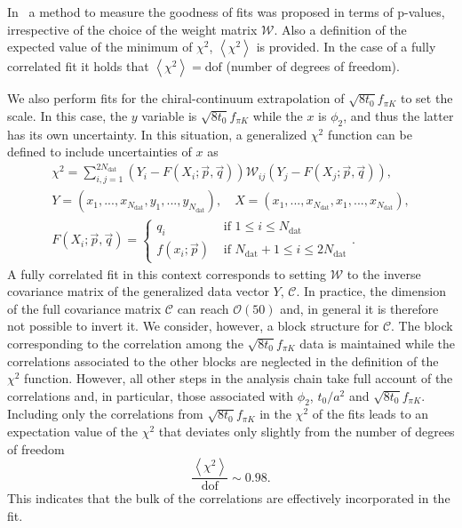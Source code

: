 In~\citep{Bruno:2022mfy} a method to measure the goodness of fits was proposed in terms of p-values, irrespective of the choice of the weight matrix $\mathcal{W}$. Also a definition of the expected value of the minimum of $\chi^2$, $\left<\chi^2\right>$ is provided. In the case of a fully correlated fit it holds that $\left<\chi^2\right>={\textrm{dof}}$ (number of degrees of freedom).

We also perform fits for the chiral-continuum extrapolation of $\sqrt{8t_0}f_{\pi K}$ to set the scale. In this case, the $y$ variable is $\sqrt{8t_0}f_{\pi K}$ while the $x$ is $\phi_2$, and thus the latter has its own uncertainty. In this situation, a generalized $\chi^2$ function can be defined to include uncertainties of $x$ as
\begin{gather}
\label{apex_chisq:eq:chisq_generalized}
\chi^2=\sum_{i,j=1}^{2N_{\textrm{dat}}}\left(Y_i-F(X_i;\vec{p},\vec{q})\right)\mathcal{W}_{ij}\left(Y_j-F(X_j;\vec{p},\vec{q})\right), \\
Y=(x_1,...,x_{N_{\textrm{dat}}},y_1,...,y_{N_{\textrm{dat}}}), \quad
X=(x_1,...,x_{N_{\textrm{dat}}},x_1,...,x_{N_{\textrm{dat}}}), \\
F(X_i;\vec{p},\vec{q})=\left\{\begin{matrix}
q_i & \textrm{ if $1\leq i\leq N_{\textrm{dat}}$} \\ 
f(x_i;\vec{p}) & \textrm{ if $N_{\textrm{dat}}+1\leq i\leq 2N_{\textrm{dat}}$}
\end{matrix}\right..
\end{gather}
A fully correlated fit in this context corresponds to setting $\mathcal{W}$ to the inverse covariance matrix of the generalized data vector $Y$, $\mathcal{C}$. In practice, the dimension of the full covariance matrix $\mathcal{C}$ can reach $\mathcal{O}(50)$ and, in general it is therefore not possible to invert it. We consider, however, a block structure for $\mathcal{C}$. The block corresponding to the correlation among  the $\sqrt{8t_0}f_{\pi K}$ data is maintained while the correlations associated to the other blocks are neglected in the definition of the $\chi^2$ function. However, all other steps in the analysis chain take full account  of the correlations and, in particular, those associated with $\phi_2$, $t_0/a^2$ and $\sqrt{8t_0}f_{\pi K}$. Including only the correlations from $\sqrt{8t_0}f_{\pi K}$ in the $\chi^2$ of the fits leads to an expectation value of the $\chi^2$ that deviates only slightly from the number of degrees of freedom
\begin{equation}
\frac{\left<\chi^2\right>}{{\textrm{dof}}}\sim0.98.
\end{equation}
This indicates that the bulk of the correlations are effectively incorporated in the fit.




